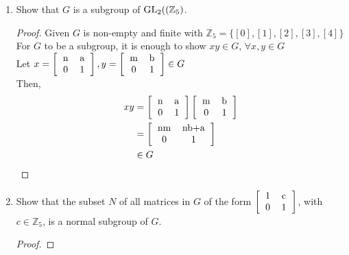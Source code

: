 \documentclass[paper=usletter, fontsize=12pt]{article}
\begin{document}
\begin{itemize}
\begin{enumerate}
\begin{enumerate}
                \item Show that $G$ is a subgroup of $\text{GL}_2((\mathbb{Z}_5)$.
                \begin{proof}

                    Given $G$ is non-empty and finite with $\mathbb{Z}_5 =
                    \{[0],[1],[2],[3],[4]\}$\\
                    For $G$ to be a subgroup, it is enough to show $xy \in G$, $\forall x,y\in G$\\

                    Let $x=\left[\begin{tabular}{cc}
                            n & a \\
                            0 & 1
                    \end{tabular}\right],y=\left[\begin{tabular}{cc}
                                m & b \\
                                0 & 1
                    \end{tabular}\right] \in G$\\
                    Then,
                    \begin{align*}
                        xy & = \left[\begin{tabular}{cc}
                                n & a \\
                                0 & 1
                    \end{tabular}\right]\left[\begin{tabular}{cc}
                                m & b \\
                                0 & 1
                    \end{tabular}\right]\\
                    & = \left[\begin{tabular}{cc}
                                nm & nb+a \\
                                0 & 1
                    \end{tabular}\right]\\
                    & \in G \qedhere
                    \end{align*}

                \end{proof}

                \item Show that the subset $N$ of all matrices in $G$ of the form $\left[\begin{tabular}{cc}
                            1 & c \\
                            0 & 1
                \end{tabular}\right]$, with $c \in \mathbb{Z}_5$, is a normal
                subgroup of $G$.
                \begin{proof}
                \end{proof}


\end{enumerate}
\end{enumerate}
\end{itemize}
\end{document}
